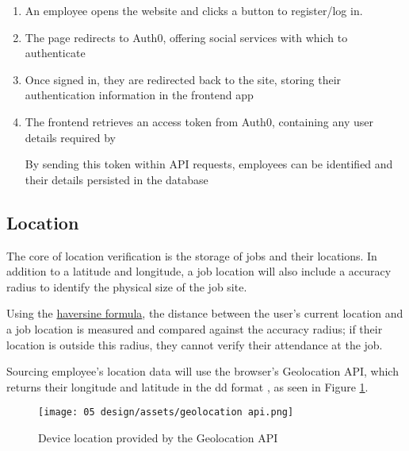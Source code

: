 \begin{enumerate}

  \item An employee opens the \projectname{} website and
        clicks a button to register/log in.

  \item The page redirects to Auth0, offering social
        services with which to authenticate

  \item Once signed in, they are redirected back to the
        \projectname{} site, storing their authentication
        information in the frontend app

  \item The frontend retrieves an access token from Auth0,
        containing any user details required by
        \projectname{}

        By sending this token within API requests, employees can be
        identified and their details persisted in the database

\end{enumerate} 

\subsection{Location} 

The core of location verification is the storage of jobs
and their locations.
In addition to a latitude and longitude, a job location
will also include a accuracy radius to identify the
physical size of the job site.

Using the \hyperref[ss:coordSystems]{haversine formula},
the distance between the user's current location and a job
location is measured and compared against the accuracy
radius; if their location is outside this radius, they
cannot verify their attendance at the job.

Sourcing employee's location data will use the browser's
Geolocation API, which returns their longitude and latitude
in the \gls{dd} format \parencite{geolocationApi}, as seen
in Figure \ref{fig:geolocationApi}.

\begin{figure}[h]
  \centering
  \texttt{[image: 05
    design/assets/geolocation api.png]}
  \caption{Device location provided by the Geolocation API}
  \label{fig:geolocationApi}
  \parencite{geolocationApi}
\end{figure}

